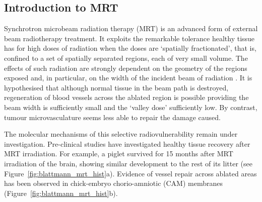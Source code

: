 	
	
	\subsection{Introduction to MRT}
	Synchrotron microbeam radiation therapy (MRT) is an advanced form of external beam radiotherapy treatment. It exploits the remarkable tolerance healthy tissue has for high doses of radiation when the doses are `spatially fractionated', that is, confined to a set of spatially separated regions, each of very small volume. The effects of such radiation are strongly dependent on the geometry of the regions exposed and, in particular, on the width of the incident beam of radiation \cite{brauer-krischeffects2010}. It is hypothesised that although normal tissue in the beam path is destroyed, regeneration of blood vessels across the ablated region is possible providing the beam width is sufficiently small and the `valley dose' sufficiently low. By contrast, tumour microvasculature seems less able to repair the damage caused. 
	
	
	
	The molecular mechanisms of this selective radiovulnerability remain under investigation. Pre-clinical studies have investigated healthy tissue recovery after MRT irradiation. For example, a piglet  survived for 15 months after MRT irradiation of the brain, showing similar development to the rest of its litter (see Figure~\ref{fig:blattmann_mrt_hist}a). Evidence of vessel repair across ablated areas has been observed in  chick-embryo chorio-amniotic (CAM) membranes (Figure~\ref{fig:blattmann_mrt_hist}b). 
	
